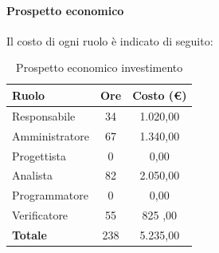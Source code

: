 \documentclass[../PianoDiProgetto.tex]{subfiles}
\begin{document}
			\newpage
			\paragraph{Prospetto economico}
			Il costo di ogni ruolo è indicato di seguito:
			\begin{table}[h]
				\centering
				\begin{tabular}{l * {2}{c}}
				\toprule
				\textbf{Ruolo} & \textbf{Ore} & \textbf{Costo (\euro{})} \\
				\midrule
				Responsabile & 34 & 1.020,00 \\
				Amministratore & 67 & 1.340,00 \\
				Progettista & 0 & 0,00 \\
				Analista & 82 & 2.050,00 \\		
				Programmatore & 0 & 0,00 \\		
				Verificatore & 55 & 825 ,00 \\				
				\midrule		
				\textbf{Totale} & 238 & 5.235,00 \\
				\bottomrule	
				\end{tabular}
				\caption{Prospetto economico investimento}		
			\end{table}
			
\end{document}
